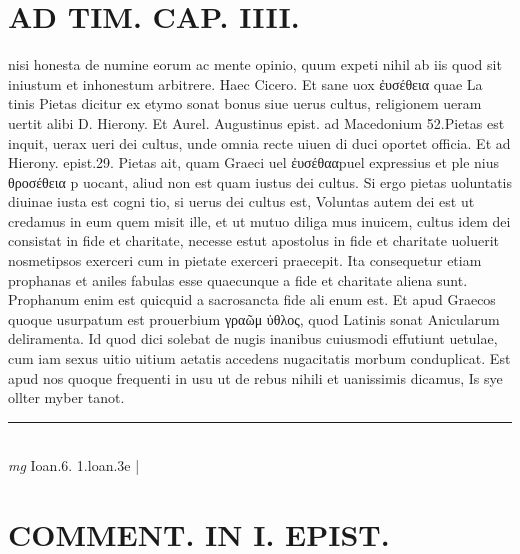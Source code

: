 \documentclass{article}
\begin{document}
\begin{pages}
\section*{AD TIM. CAP. IIII. }
\marginpar{[ p.142 ]}\pstart nisi honesta de numine eorum ac mente opinio, quum expeti nihil ab iis quod sit iniustum et inhonestum arbitrere. Haec Cicero. Et sane uox ἐυσέθεια quae La tinis Pietas dicitur ex etymo sonat bonus siue uerus cultus, religionem ueram uertit alibi D. Hierony. Et Aurel. Augustinus epist. ad Macedonium 52.Pietas est inquit, uerax ueri dei cultus, unde omnia recte uiuen di duci oportet officia. Et ad Hierony. epist.29. Pietas ait, quam Graeci uel ἐυσέθααpuel expressius et ple nius θροσέθεια p uocant, aliud non est quam iustus dei cultus. Si ergo pietas uoluntatis diuinae iusta est cogni tio, si uerus dei cultus est, Voluntas autem dei est ut credamus in eum quem misit ille, et ut mutuo diliga mus inuicem, cultus idem dei consistat in fide et charitate, necesse estut apostolus in fide et charitate uoluerit nosmetipsos exerceri cum in pietate exerceri praecepit. Ita consequetur etiam prophanas et aniles fabulas esse quaecunque a fide et charitate aliena sunt. Prophanum enim est quicquid a sacrosancta fide ali enum est. Et apud Graecos quoque usurpatum est prouerbium γραῶμ ὐθλος, quod Latinis sonat Anicularum deliramenta. Id quod dici solebat de nugis inanibus cuiusmodi effutiunt uetulae, cum iam sexus uitio uitium aetatis accedens nugacitatis morbum conduplicat. Est apud nos quoque frequenti in usu ut de rebus nihili et uanissimis dicamus, Is sye ollter myber tanot.  \pend
\vspace{0.5cm}\noindent
\vspace{0.2cm}\rule{1cm}{0.2pt}\\ 
\hspace{0.2cm}\textit{mg}
\footnotesize Ioan.6. 1.loan.3e 
\normalsize| 
\section*{COMMENT. IN I. EPIST. }
{}

\end{pages}
\end{document}
